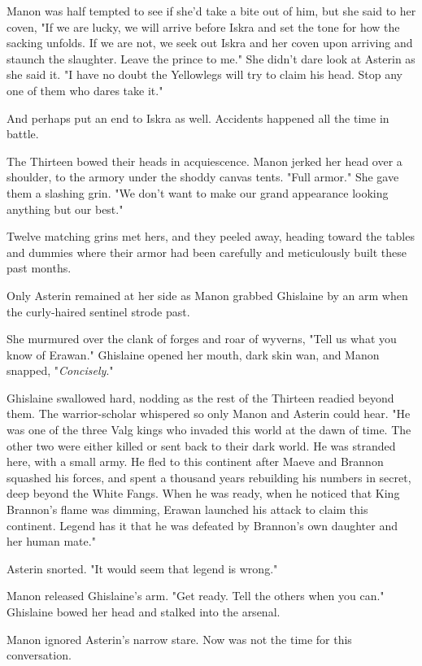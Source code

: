 Manon was half tempted to see if she'd take a bite out of him, but she said to her coven, "If we are lucky, we will arrive before Iskra and set the tone for how the sacking unfolds. If we are not, we seek out Iskra and her coven upon arriving and staunch the slaughter. Leave the prince to me." She didn't dare look at Asterin as she said it. "I have no doubt the Yellowlegs will try to claim his head. Stop any one of them who dares take it."

And perhaps put an end to Iskra as well. Accidents happened all the time in battle.

The Thirteen bowed their heads in acquiescence. Manon jerked her head over a shoulder, to the armory under the shoddy canvas tents. "Full armor." She gave them a slashing grin. "We don't want to make our grand appearance looking anything but our best."

Twelve matching grins met hers, and they peeled away, heading toward the tables and dummies where their armor had been carefully and meticulously built these past months.

Only Asterin remained at her side as Manon grabbed Ghislaine by an arm when the curly-haired sentinel strode past.

She murmured over the clank of forges and roar of wyverns, "Tell us what you know of Erawan." Ghislaine opened her mouth, dark skin wan, and Manon snapped, "\emph{Concisely}."

Ghislaine swallowed hard, nodding as the rest of the Thirteen readied beyond them. The warrior-scholar whispered so only Manon and Asterin could hear. "He was one of the three Valg kings who invaded this world at the dawn of time. The other two were either killed or sent back to their dark world. He was stranded here, with a small army. He fled to this continent after Maeve and Brannon squashed his forces, and spent a thousand years rebuilding his numbers in secret, deep beyond the White Fangs. When he was ready, when he noticed that King Brannon's flame was dimming, Erawan launched his attack to claim this continent. Legend has it that he was defeated by Brannon's own daughter and her human mate."

Asterin snorted. "It would seem that legend is wrong."

Manon released Ghislaine's arm. "Get ready. Tell the others when you can." Ghislaine bowed her head and stalked into the arsenal.

Manon ignored Asterin's narrow stare. Now was not the time for this conversation.

